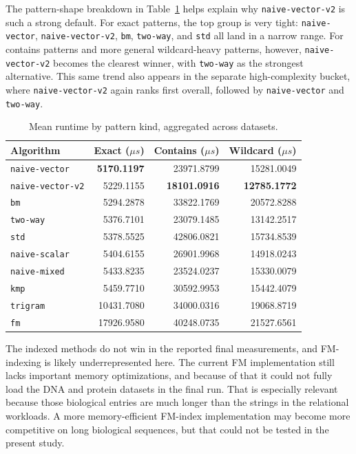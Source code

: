 \documentclass[11pt]{article}
\begin{document}
\normalsize

The pattern-shape breakdown in Table~\ref{tab:pattern-kind} helps explain why \texttt{naive-vector-v2} is such a strong default. For exact patterns, the top group is very tight: \texttt{naive-vector}, \texttt{naive-vector-v2}, \texttt{bm}, \texttt{two-way}, and \texttt{std} all land in a narrow range. For contains patterns and more general wildcard-heavy patterns, however, \texttt{naive-vector-v2} becomes the clearest winner, with \texttt{two-way} as the strongest alternative. This same trend also appears in the separate high-complexity bucket, where \texttt{naive-vector-v2} again ranks first overall, followed by \texttt{naive-vector} and \texttt{two-way}.

\begin{table}[h]
\centering
\small
\begin{tabular}{@{}lrrr@{}}
\toprule
Algorithm & Exact (\(\mu s\)) & Contains (\(\mu s\)) & Wildcard (\(\mu s\)) \\
\midrule
\texttt{naive-vector}    & \textbf{5170.1197} & 23971.8799 & 15281.0049 \\
\texttt{naive-vector-v2} & 5229.1155          & \textbf{18101.0916} & \textbf{12785.1772} \\
\texttt{bm}              & 5294.2878          & 33822.1769 & 20572.8288 \\
\texttt{two-way}         & 5376.7101          & 23079.1485 & 13142.2517 \\
\texttt{std}             & 5378.5525          & 42806.0821 & 15734.8539 \\
\texttt{naive-scalar}    & 5404.6155          & 26901.9968 & 14918.0243 \\
\texttt{naive-mixed}     & 5433.8235          & 23524.0237 & 15330.0079 \\
\texttt{kmp}             & 5459.7710          & 30592.9953 & 15442.4079 \\
\texttt{trigram}         & 10431.7080         & 34000.0316 & 19068.8719 \\
\texttt{fm}              & 17926.9580         & 40248.0735 & 21527.6561 \\
\bottomrule
\end{tabular}
\caption{Mean runtime by pattern kind, aggregated across datasets.}
\label{tab:pattern-kind}
\end{table}

The indexed methods do not win in the reported final measurements, and FM-indexing is likely underrepresented here. The current FM implementation still lacks important memory optimizations, and because of that it could not fully load the DNA and protein datasets in the final run. That is especially relevant because those biological entries are much longer than the strings in the relational workloads. A more memory-efficient FM-index implementation may become more competitive on long biological sequences, but that could not be tested in the present study.
\end{document}
